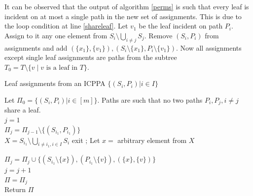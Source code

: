 \documentclass[MS]             %
              {iitmdiss_as}    %
\begin{document}
\noindent
It can be observed that the output of algorithm \ref{perms} is such
that every leaf is incident on at most a single path in the new set of
assignments. This is due to the loop condition at line
\ref{shareleaf}. Let $v_1$ be the leaf incident on path $P_i$. Assign
to it any one element from $S_i \setminus \bigcup_{i \ne j}
S_j$. Remove $(S_i, P_i)$ from assignments and add $(\{x_1\},
\{v_1\}), (S_i \setminus \{x_1\}, P_i \setminus \{v_1\})$. Now all
assignments except single leaf assignments are paths from the subtree
$T_0 = T \setminus \{v \mid v \text{ is a leaf in } T\}$.


\begin{algorithm}[h]
  \caption{Leaf assignments from an ICPPA $\{(S_i,P_i) | i \in I\}$}
  \label{leafasgn}
  \begin{algorithmic}
    \STATE Let $\Pi_0=\{(S_i,P_i)| i \in [m]\}$. Paths are such that
    no
    two paths $P_i, P_j, i \ne j$ share a leaf.\\
    \STATE $j = 1$\\
    \STATE $\Pi_j=   \Pi_{j-1} \setminus \{(S_{i_1}, P_{i_1})\}$\\
    \STATE $X = S_{i_1} \setminus \bigcup_{i \ne i_1, i \in I}S_i$
     \STATE exit \ENDIF; \STATE Let $x = $ arbitrary
    element from $X$ \vspace{2mm}

    \STATE $\Pi_j = \Pi_j \cup \{(S_{i_1} \setminus \{x\}),(P_{i_1}
    \setminus
    \{v\}), (\{x\},\{v\})\}$\\
    \STATE $j = j+1$\\
    \ENDWHILE
    \STATE $\Pi = \Pi_j$\\
    \STATE Return $\Pi$\\
  \end{algorithmic}
\end{algorithm}
\end{document}
